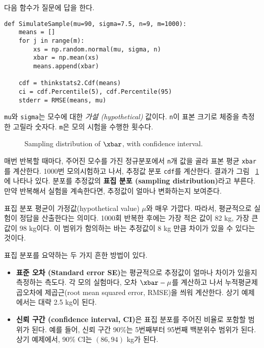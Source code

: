 다음 함수가 질문에 답을 한다.

\begin{verbatim}
def SimulateSample(mu=90, sigma=7.5, n=9, m=1000):
    means = []
    for j in range(m):
        xs = np.random.normal(mu, sigma, n)
        xbar = np.mean(xs)
        means.append(xbar)

    cdf = thinkstats2.Cdf(means)
    ci = cdf.Percentile(5), cdf.Percentile(95)
    stderr = RMSE(means, mu)
\end{verbatim}

{\tt mu}와 {\tt sigma}는 모수에 대한 {\em 가설 (hypothetical)} 값이다.
{\tt n}이 표본 크기로 체중을 측정한 고릴라 숫자다.
{\tt m}은 모의 시험을 수행한 횟수다.

\begin{figure}
\caption{Sampling distribution of $\xbar$, with confidence interval.}
\label{estimation1}
\end{figure}

매번 반복할 때마다, 주어진 모수를 가진 정규분포에서 {\tt n}개 값을 골라 
표본 평균 {\tt xbar}를 계산한다. 1000번 모의시험하고 나서, 추정값 분포 {\tt cdf}를 계산한다. 결과가 그림 ~\ref{estimation1}에 나타나 있다.
분포를 추정값의 {\bf 표집 분포 (sampling distribution)}라고 부른다.
만약 반복해서 실험을 계속한다면, 추정값이 얼마나 변화하는지 보여준다.

표집 분포 평균이 가정값(hypothetical value) $\mu$와 매우 가깝다.
따라서, 평균적으로 실험이 정답을 산출한다는 의미다.
1000회 반복한 후에는 가장 적은 값이 82 kg, 가장 큰 값이 98 kg이다.
이 범위가 함의하는 바는 추정값이 8 kg 만큼 차이가 있을 수 있다는 것이다.

표집 분포를 요약하는 두 가지 흔한 방법이 있다.

\begin{itemize}

\item {\bf 표준 오차 (Standard error SE)}는 평균적으로 추정값이 얼마나 차이가 있을지 측정하는 측도다. 각 모의 실험마다, 오차 $\xbar - \mu$를 계산하고 나서 누적평균제곱오차에 제곱근(root mean squared error, RMSE)을 씌워 계산한다. 상기 예제에서는 대략 2.5 kg이 된다.

\item {\bf 신뢰 구간 (confidence interval, CI)}은 표집 분포를 주어진 비율로 포함할 범위가 된다. 예를 들어, 신뢰 구간 90\%는 5번째부터 95번째 백분위수 범위가 된다. 상기 예제에서, 90\% CI는 $(86, 94)$ kg가 된다.

\end{itemize}

